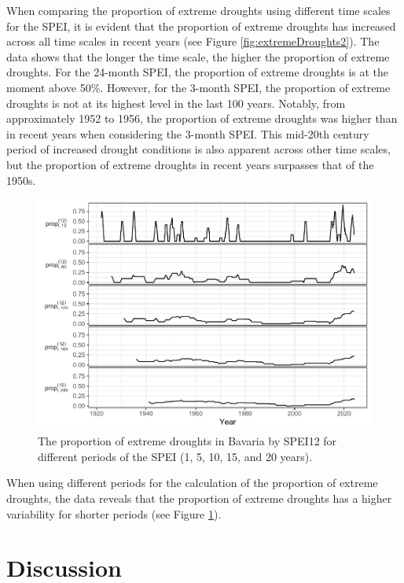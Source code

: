 \documentclass[
]{krantz}
\begin{document}
When comparing the proportion of extreme droughts using different time scales for the SPEI, it is evident that the proportion of extreme droughts has increased across all time scales in recent years (see Figure \ref{fig:extremeDroughts2}). The data shows that the longer the time scale, the higher the proportion of extreme droughts.
For the 24-month SPEI, the proportion of extreme droughts is at the moment above 50\%.
However, for the 3-month SPEI, the proportion of extreme droughts is not at its highest level in the last 100 years. Notably, from approximately 1952 to 1956, the proportion of extreme droughts was higher than in recent years when considering the 3-month SPEI. This mid-20th century period of increased drought conditions is also apparent across other time scales, but the proportion of extreme droughts in recent years surpasses that of the 1950s.

\begin{figure}
\centering
\includegraphics{book_files/figure-latex/extremeDroughts3-1.pdf}
\caption{\label{fig:extremeDroughts3}The proportion of extreme droughts in Bavaria by SPEI12 for different periods of the SPEI (1, 5, 10, 15, and 20 years).}
\end{figure}

When using different periods for the calculation of the proportion of extreme droughts, the data reveals that the proportion of extreme droughts has a higher variability for shorter periods (see Figure \ref{fig:extremeDroughts3}).

\section{Discussion}\label{discussion}
\end{document}
